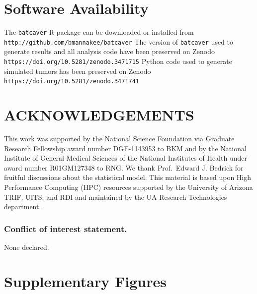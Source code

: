 \documentclass[a4,center,fleqn]{NAR}
\newcommand{\bkmcomment}[1]{{\color{blue}BKM: #1}}
\newcommand{\beginsupplement}{%
        \clearpage
        \onecolumn
        \setcounter{table}{0}
        \renewcommand{\thetable}{S\arabic{table}}%
        \setcounter{figure}{0}
        \renewcommand{\thefigure}{S\arabic{figure}}%
     }
\begin{document}

\section{Software Availability}

The \texttt{batcaver} R package can be downloaded or installed from \texttt{http://github.com/bmannakee/batcaver}
The version of \texttt{batcaver} used to generate results and all analysis code have been preserved on Zenodo \texttt{https://doi.org/10.5281/zenodo.3471715}
Python code used to generate simulated tumors has been preserved on Zenodo \texttt{https://doi.org/10.5281/zenodo.3471741}





\section{ACKNOWLEDGEMENTS}

This work was supported by the National Science Foundation via Graduate Research Fellowship award number DGE-1143953 to BKM and by the National Institute of General Medical Sciences of the National Institutes of Health under award number R01GM127348 to RNG.
We thank Prof.\ Edward J. Bedrick for fruitful discussions about the statistical model.
This material is based upon High Performance Computing (HPC) resources supported by the University of Arizona TRIF, UITS, and RDI and maintained by the UA Research Technologies department.

\subsubsection{Conflict of interest statement.} None declared.



\beginsupplement
\section{Supplementary Figures}
\end{document}
